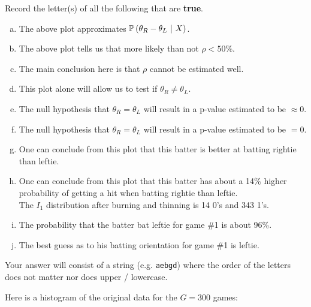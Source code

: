 \documentclass[12pt]{article}
\newcommand{\instr}{\scriptsize Your answer will consist of a string (e.g. \texttt{aebgd}) where the order of the letters does not matter nor does upper / lowercase. \normalsize}
\newcommand{\recordletters}{\small Record the letter(s) of all the following that are \textbf{true}. \normalsize}
\begin{document}
\vspace{-1cm}
\benum{} \recordletters

\begin{enumerate}[(a)]
\item The above plot approximates $\mathbb{P}\left(\theta_R - \theta_L~|~X\right)$.
\item The above plot tells us that more likely than not $\rho < 50\%$.
\item The main conclusion here is that $\rho$ cannot be estimated well.
\item This plot alone will allow us to test if $\theta_R \neq \theta_L$.
\item The null hypothesis that $\theta_R = \theta_L$ will result in a p-value estimated to be $\approx 0$.
\item The null hypothesis that $\theta_R = \theta_L$ will result in a p-value estimated to be $= 0$.
\item One can conclude from this plot that this batter is better at batting rightie than leftie.
\item One can conclude from this plot that this batter has about a 14\% higher probability of getting a hit when batting rightie than leftie.\\

The $I_1$ distribution after burning and thinning is 14 0's and 343 1's.

\item The probability that the batter bat leftie for game \#1 is about 96\%.
\item The best guess as to his batting orientation for game \#1 is leftie.
\end{enumerate}\eenum\instr\pagebreak


\problem [4min]  Here is a histogram of the original data for the $G = 300$ games:
\end{document}
